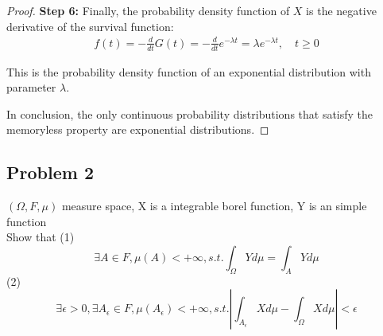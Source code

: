\begin{proof}
    \textbf{Step 6:} Finally, the probability density function of $X$ is the negative derivative of the survival function:
    \begin{align*}
    f(t) = -\frac{d}{dt}G(t) = -\frac{d}{dt}e^{-\lambda t} = \lambda e^{-\lambda t}, \quad t \geq 0
    \end{align*}
    
    This is the probability density function of an exponential distribution with parameter $\lambda$.
    
    In conclusion, the only continuous probability distributions that satisfy the memoryless property are exponential distributions.
    \end{proof}
\subsection*{Problem 2}
$ (\Omega,F,\mu) $ measure space, X is a integrable borel function, Y is an  simple function 
\\Show that (1)$$
    \exists A\in F ,\mu(A)<+\infty ,s.t. \int_\Omega Y d\mu=\int_A Y d\mu
$$ 
(2) $$
    \exists \epsilon>0, \exists A_\epsilon\in F, \mu(A_\epsilon)<+\infty, s.t. |\int_{A_\epsilon} X d \mu-\int_\Omega Xd\mu|<\epsilon
$$ 
